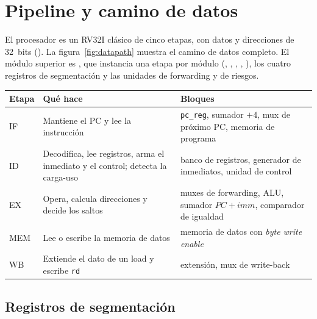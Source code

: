 \section{Pipeline y camino de datos}
\label{sec:pipeline}


El procesador es un RV32I clásico de cinco etapas, con datos y direcciones de 32~bits
(). La figura~\ref{fig:datapath} muestra el camino de datos completo.
El módulo superior es , que instancia una etapa por módulo
(, , , , ), los
cuatro registros de segmentación y las unidades de forwarding y de riesgos.

\begin{center}
\small
\begin{tabular}{@{}l p{6.2cm} p{5.6cm}@{}}
  \toprule
  \textbf{Etapa} & \textbf{Qué hace} & \textbf{Bloques} \\
  \midrule
  IF  & Mantiene el PC y lee la instrucción & \texttt{pc\_reg}, sumador $+4$, mux de próximo PC, memoria de programa \\
  ID  & Decodifica, lee registros, arma el inmediato y el control; detecta la carga-uso & banco de registros, generador de inmediatos, unidad de control \\
  EX  & Opera, calcula direcciones y decide los saltos & muxes de forwarding, ALU, sumador $PC+imm$, comparador de igualdad \\
  MEM & Lee o escribe la memoria de datos & memoria de datos con \emph{byte write enable} \\
  WB  & Extiende el dato de un load y escribe \texttt{rd} & extensión, mux de write-back \\
  \bottomrule
\end{tabular}
\end{center}

\subsection{Registros de segmentación}

